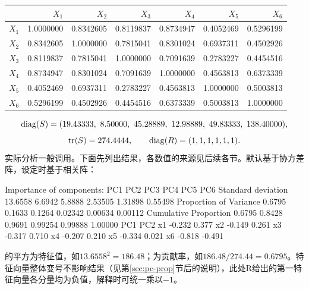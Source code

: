 \par\addvspace{5pt}\begin{center}\begin{minipage}{\linewidth}\centering
\small
{}
\begin{tabular}{lrrrrrr}\toprule
 &{\bfseries  $X_1$ }&{\bfseries  $X_2$ }&{\bfseries  $X_3$ }&{\bfseries  $X_4$ }&{\bfseries  $X_5$ }&{\bfseries  $X_6$}\\\midrule
$X_1$ & 1.0000000 & 0.8342605 & 0.8119837 & 0.8734947 & 0.4052469 & 0.5296199\\
$X_2$ & 0.8342605 & 1.0000000 & 0.7815041 & 0.8301024 & 0.6937311 & 0.4502926\\
$X_3$ & 0.8119837 & 0.7815041 & 1.0000000 & 0.7091639 & 0.2783227 & 0.4454516\\
$X_4$ & 0.8734947 & 0.8301024 & 0.7091639 & 1.0000000 & 0.4563813 & 0.6373339\\
$X_5$ & 0.4052469 & 0.6937311 & 0.2783227 & 0.4563813 & 1.0000000 & 0.5003813\\
$X_6$ & 0.5296199 & 0.4502926 & 0.4454516 & 0.6373339 & 0.5003813 & 1.0000000\\
\bottomrule\end{tabular}
\end{minipage}\end{center}

\[
\diag(S)=(19.43333,\ 8.50000,\ 45.28889,\ 12.98889,\ 49.83333,\ 138.40000),
\]
\[
\operatorname{tr}(S)=274.4444,\qquad \operatorname{diag}(R)=(1,1,1,1,1,1).
\]
实际分析一般调用。下面先列出结果，各数值的来源见后续各节。默认基于协方差阵，设定时基于相关阵：
\par\noindent{}
\begin{routput}
Importance of components:
                           PC1    PC2    PC3     PC4     PC5     PC6
Standard deviation     13.6558 6.6942 5.8888 2.53505 1.31898 0.55498
Proportion of Variance  0.6795 0.1633 0.1264 0.02342 0.00634 0.00112
Cumulative Proportion   0.6795 0.8428 0.9691 0.99254 0.99888 1.00000
      PC1    PC2
x1 -0.232  0.377
x2 -0.149  0.261
x3 -0.317  0.710
x4 -0.207  0.210
x5 -0.334  0.021
x6 -0.818 -0.491
\end{routput}
的平方为特征值，如$13.6558^2=186.48$；为贡献率，如$186.48/274.44=0.6795$。特征向量整体变号不影响结果（见第\ref{sec:pc-prop}节后的说明），此处R给出的第一特征向量各分量均为负值，解释时可统一乘以$-1$。

